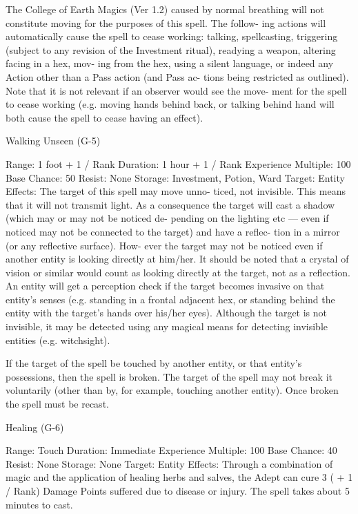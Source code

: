 \begin{Chapter}{The College of Earth Magics (Ver 1.2)}
caused  by  normal  breathing  will  not  constitute 
moving  for  the  purposes  of  this  spell.  The  follow-
ing  actions  will  automatically  cause  the  spell  to 
cease  working:  talking,  spellcasting,  triggering 
(subject  to  any  revision  of  the  Investment  ritual), 
readying  a  weapon,  altering  facing  in  a  hex,  mov-
ing from the hex, using a silent language, or indeed 
any  Action  other  than  a  Pass  action  (and  Pass  ac-
tions  being  restricted  as  outlined).  Note  that  it  is 
not  relevant  if  an  observer  would  see  the  move-
ment  for  the  spell  to  cease  working  (e.g.  moving 
hands  behind  back,  or  talking  behind  hand  will 
both cause the spell to cease having an effect). 

Walking Unseen (G-5) 

Range: 1 foot + 1 / Rank 
Duration: 1 hour + 1 / Rank 
Experience Multiple: 100 
Base Chance: 50%
Resist: None 
Storage: Investment, Potion, Ward 
Target: Entity 
Effects:  The  target  of  this  spell  may  move  unno-
ticed,  not  invisible.  This  means  that  it  will  not 
transmit light. As a consequence the target will cast 
a  shadow  (which  may  or  may  not  be  noticed  de-
pending on the lighting etc — even if noticed may 
not  be  connected  to  the  target)  and  have  a  reflec-
tion  in  a  mirror  (or  any  reflective  surface).  How-
ever  the  target  may  not be noticed  even  if  another 
entity  is  looking  directly  at  him/her.  It  should  be 
noted  that  a  crystal  of  vision  or  similar  would 
count  as  looking  directly  at  the  target,  not  as  a 
reflection.  An  entity  will  get  a  perception check if 
the target becomes invasive on that entity’s senses 
(e.g. standing in a frontal adjacent hex, or standing 
behind  the  entity  with  the  target’s  hands  over 
his/her eyes). Although the target is not invisible, it 
may  be  detected  using  any  magical  means  for 
detecting invisible entities (e.g. witchsight). 

If  the  target  of  the  spell  be  touched  by  another 
entity, or that entity’s possessions, then the spell is 
broken.  The  target  of  the  spell  may  not  break  it 
voluntarily  (other  than  by,  for  example,  touching 
another  entity).  Once  broken  the  spell  must  be 
recast. 

Healing (G-6) 

Range: Touch 
Duration: Immediate 
Experience Multiple: 100 
Base Chance: 40%
Resist: None 
Storage: None 
Target: Entity 
Effects:  Through  a  combination  of  magic  and  the 
application  of  healing  herbs  and  salves,  the  Adept 
can  cure  3  (  +  1  /  Rank)  Damage  Points  suffered 
due  to  disease  or  injury.  The  spell  takes  about  5 
minutes to cast. 


\end{Chapter}
